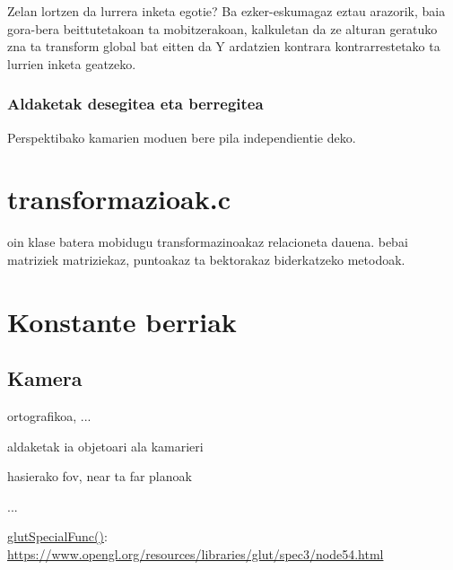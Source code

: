 \documentclass[12pt]{article}
\begin{document}
Zelan lortzen da lurrera inketa egotie? Ba ezker-eskumagaz eztau arazorik, baia gora-bera beittutetakoan ta mobitzerakoan, kalkuletan da ze alturan geratuko zna ta transform global bat eitten da Y ardatzien kontrara kontrarrestetako ta lurrien inketa geatzeko.

\subsubsection{Aldaketak desegitea eta berregitea}

Perspektibako kamarien moduen bere pila independientie deko.


\section{transformazioak.c}\label{transformazioak}

oin klase batera mobidugu transformazinoakaz relacioneta dauena. bebai matriziek matriziekaz, puntoakaz ta bektorakaz biderkatzeko metodoak.


\section{Konstante berriak}

\subsection{Kamera}\label{def_kam}

ortografikoa, ...

aldaketak ia objetoari ala kamarieri

hasierako fov, near ta far planoak

...




\begin{thebibliography}{9}

\underline{glutSpecialFunc()}:\\
\url{https://www.opengl.org/resources/libraries/glut/spec3/node54.html}


\end{thebibliography}
\end{document}
